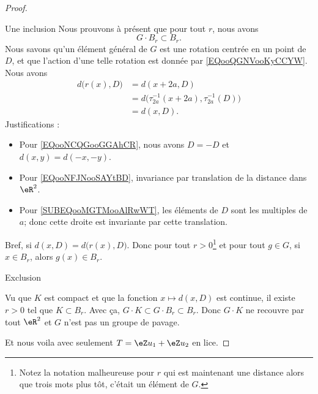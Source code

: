 \begin{proof}
\begin{subproof}
\begin{subproof}
                \item[Une inclusion]
                    Nous prouvons à présent que pour tout \( r\), nous avons
                    \begin{equation}
                        G\cdot B_r \subset B_r.
                    \end{equation}
                    Nous savons qu'un élément général de \( G\) est une rotation centrée en un point de \( D\), et que l'action d'une telle rotation est donnée par \eqref{EQooQGNVooKyCCYW}. Nous avons
                    \begin{subequations}
                        \begin{align}
                            d\big( r(x),D \big)&=d(x+2a,D)      \label{EQooNCQGooGGAhCR}\\
                            &=d\big( \tau_{2a}^{-1}(x+2a),\tau_{2a}^{-1}(D) \big)   \label{EQooNFJNooSAYtBD}\\
                            &=d(x,D)        \label{SUBEQooMGTMooAlRwWT}.
                        \end{align}
                    \end{subequations}
                    Justifications :
                    \begin{itemize}
                        \item Pour \eqref{EQooNCQGooGGAhCR}, nous avons \( D=-D\) et \(d(x,y)=d(-x,-y) \).
                        \item Pour \eqref{EQooNFJNooSAYtBD}, invariance par translation de la distance dans \( \eR^2\).
                        \item Pour \eqref{SUBEQooMGTMooAlRwWT}, les éléments de \( D\) sont les multiples de \( a\); donc cette droite est invariante par cette translation.
                    \end{itemize}
                    Bref, si \(  d(x,D)=d\big( r(x),D \big)   \). Donc pour tout \( r>0\)\footnote{Notez la notation malheureuse pour \( r\) qui est maintenant une distance alors que trois mots plus tôt, c'était un élément de \( G\).} et pour tout \( g\in G\), si \( x\in B_r\), alors \( g(x)\in B_r\).

                \item[Exclusion]

                    Vu que \( K\) est compact et que la fonction \( x\mapsto d(x,D)\) est continue, il existe \( r>0\) tel que \( K\subset B_r\). Avec ça, \( G\cdot K\subset G\cdot B_r\subset B_r\). Donc \( G\cdot K\) ne recouvre par tout \( \eR^2\) et \( G\) n'est pas un groupe de pavage.

            \end{subproof}
    \end{subproof}

    Et nous voila avec seulement \( T=\eZ u_1+\eZ u_2\) en lice.
    
\end{proof}
